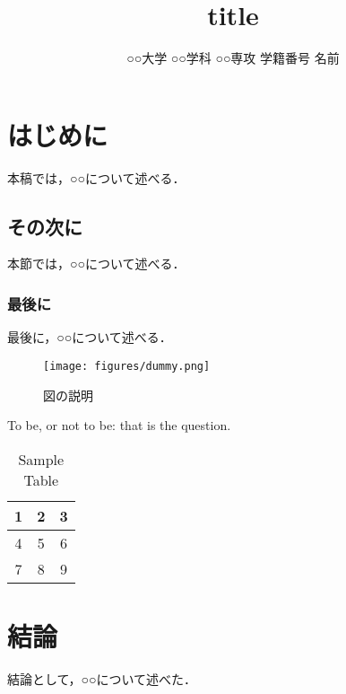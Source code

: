 \documentclass{classes/resume}
\title{
	title
}
\author{
	○○大学 ○○学科 ○○専攻 学籍番号 名前
}
\begin{document}
\maketitle

\section{はじめに}
本稿では，○○について述べる．
\subsection{その次に}
本節では，○○について述べる．
\subsubsection{最後に}
最後に，○○について述べる．

\begin{figure}[htbp]
    \centering
    \texttt{[image: figures/dummy.png]}
    \caption{図の説明\cite{ref:nomura2022uwb}\cite{ref:青空文庫Aozo22:online}}
    \label{fig:fig1}
\end{figure}


To be, or not to be: that is the question.


\begin{table}[h]
    \centering
    \begin{tabular}{|c|c|c|}
        \hline
        1 & 2 & 3 \\
        \hline
        4 & 5 & 6 \\
        \hline
        7 & 8 & 9 \\
        \hline
    \end{tabular}
    \caption{Sample Table}
    \label{tab:sample}
\end{table}

\section{結論}
結論として，○○について述べた．


\end{document}
